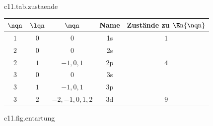 \begin{tpctable}{c11.tab.zustaende}
  \caption{Die Zustände der Relativbewegung bis $\nqn = 3$. Die Buchstaben s, p, d
    stehen für $\lqn = 0, 1, 2$; in der letzten Spalte steht die Zahl der Zustände
    gleicher Energie nach \eqref{c11.eq.entartung}. Der Spin ist nicht mitgezählt.}
  \begin{tabular}{ccccc}
    \toprule
    $\nqn$ & $\lqn$ & $\mqn$ & Name & Zustände zu $\En{\nqn}$ \\
    \midrule
    $1$ & $0$ & $0$ & 1s & $1$ \\
    \midrule
    $2$ & $0$ & $0$ & 2s & \\
    $2$ & $1$ & $-1, 0, 1$ & 2p & $4$ \\
    \midrule
    $3$ & $0$ & $0$ & 3s & \\
    $3$ & $1$ & $-1, 0, 1$ & 3p & \\
    $3$ & $2$ & $-2, -1, 0, 1, 2$ & 3d & $9$ \\
    \bottomrule
  \end{tabular}
\end{tpctable}

\begin{tpcfigure}{c11.fig.entartung}
  \caption{Dieselben Zustände wie in Tabelle~\ref{c11.tab.zustaende}, nach $\nqn$ und $\lqn$ sortiert, für $\Znuc = 1$. Jeder kurze Strich ist ein Zustand; seine Höhe ist die Energie $\En{\nqn}$ in Einheiten von $\RydRed$. Striche auf gleicher Höhe haben dieselbe Energie, gleichgültig in welcher Spalte sie stehen. Rechts steht ihre Anzahl $\nqn^2$.}
\end{tpcfigure}

